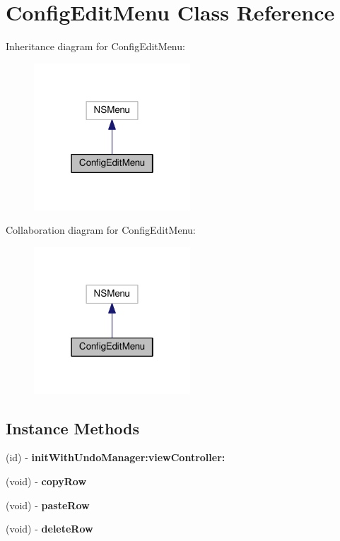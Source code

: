 \hypertarget{interfaceConfigEditMenu}{}\section{Config\+Edit\+Menu Class Reference}
\label{interfaceConfigEditMenu}


Inheritance diagram for Config\+Edit\+Menu\+:
\nopagebreak
\begin{figure}[H]
\begin{center}
\leavevmode
\includegraphics[width=166pt]{interfaceConfigEditMenu__inherit__graph}
\end{center}
\end{figure}


Collaboration diagram for Config\+Edit\+Menu\+:
\nopagebreak
\begin{figure}[H]
\begin{center}
\leavevmode
\includegraphics[width=166pt]{interfaceConfigEditMenu__coll__graph}
\end{center}
\end{figure}
\subsection*{Instance Methods}
\begin{DoxyCompactItemize}
\item 
(id) -\/ {\bfseries init\+With\+Undo\+Manager\+:view\+Controller\+:}
\item 
\mbox{\label{interfaceConfigEditMenu_a1599e444ad49a8a8f8239d573377a8a8}} 
(void) -\/ {\bfseries copy\+Row}
\item 
\mbox{\label{interfaceConfigEditMenu_a9350af3e1ce284e899a35f472ce28333}} 
(void) -\/ {\bfseries paste\+Row}
\item 
\mbox{\label{interfaceConfigEditMenu_a0d71c491814ce8616568b11cb1a931ac}} 
(void) -\/ {\bfseries delete\+Row}
\end{DoxyCompactItemize}


